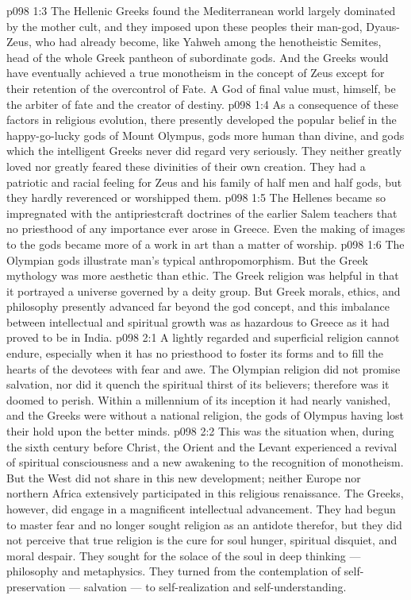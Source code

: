 \vs p098 1:3 The Hellenic Greeks found the Mediterranean world largely dominated by the mother cult, and they imposed upon these peoples their man\hyp{}god, Dyaus\hyp{}Zeus, who had already become, like Yahweh among the henotheistic Semites, head of the whole Greek pantheon of subordinate gods. And the Greeks would have eventually achieved a true monotheism in the concept of Zeus except for their retention of the overcontrol of Fate. A God of final value must, himself, be the arbiter of fate and the creator of destiny.
\vs p098 1:4 As a consequence of these factors in religious evolution, there presently developed the popular belief in the happy\hyp{}go\hyp{}lucky gods of Mount Olympus, gods more human than divine, and gods which the intelligent Greeks never did regard very seriously. They neither greatly loved nor greatly feared these divinities of their own creation. They had a patriotic and racial feeling for Zeus and his family of half men and half gods, but they hardly reverenced or worshipped them.
\vs p098 1:5 The Hellenes became so impregnated with the antipriestcraft doctrines of the earlier Salem teachers that no priesthood of any importance ever arose in Greece. Even the making of images to the gods became more of a work in art than a matter of worship.
\vs p098 1:6 The Olympian gods illustrate man’s typical anthropomorphism. But the Greek mythology was more aesthetic than ethic. The Greek religion was helpful in that it portrayed a universe governed by a deity group. But Greek morals, ethics, and philosophy presently advanced far beyond the god concept, and this imbalance between intellectual and spiritual growth was as hazardous to Greece as it had proved to be in India.
\vs p098 2:1 A lightly regarded and superficial religion cannot endure, especially when it has no priesthood to foster its forms and to fill the hearts of the devotees with fear and awe. The Olympian religion did not promise salvation, nor did it quench the spiritual thirst of its believers; therefore was it doomed to perish. Within a millennium of its inception it had nearly vanished, and the Greeks were without a national religion, the gods of Olympus having lost their hold upon the better minds.
\vs p098 2:2 This was the situation when, during the sixth century before Christ, the Orient and the Levant experienced a revival of spiritual consciousness and a new awakening to the recognition of monotheism. But the West did not share in this new development; neither Europe nor northern Africa extensively participated in this religious renaissance. The Greeks, however, did engage in a magnificent intellectual advancement. They had begun to master fear and no longer sought religion as an antidote therefor, but they did not perceive that true religion is the cure for soul hunger, spiritual disquiet, and moral despair. They sought for the solace of the soul in deep thinking --- philosophy and metaphysics. They turned from the contemplation of self\hyp{}preservation --- salvation --- to self\hyp{}realization and self\hyp{}understanding.
